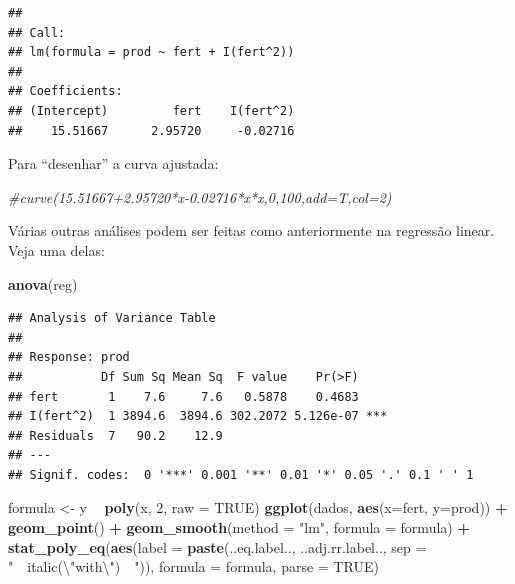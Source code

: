 \documentclass[
]{book}
\newenvironment{Shaded}{\begin{snugshade}}{\end{snugshade}}
\newcommand{\CharTok}[1]{\textcolor[rgb]{0.31,0.60,0.02}{#1}}
\newcommand{\CommentTok}[1]{\textcolor[rgb]{0.56,0.35,0.01}{\textit{#1}}}
\newcommand{\DataTypeTok}[1]{\textcolor[rgb]{0.13,0.29,0.53}{#1}}
\newcommand{\DecValTok}[1]{\textcolor[rgb]{0.00,0.00,0.81}{#1}}
\newcommand{\KeywordTok}[1]{\textcolor[rgb]{0.13,0.29,0.53}{\textbf{#1}}}
\newcommand{\NormalTok}[1]{#1}
\newcommand{\OperatorTok}[1]{\textcolor[rgb]{0.81,0.36,0.00}{\textbf{#1}}}
\newcommand{\OtherTok}[1]{\textcolor[rgb]{0.56,0.35,0.01}{#1}}
\newcommand{\StringTok}[1]{\textcolor[rgb]{0.31,0.60,0.02}{#1}}
\begin{document}
\begin{verbatim}
## 
## Call:
## lm(formula = prod ~ fert + I(fert^2))
## 
## Coefficients:
## (Intercept)         fert    I(fert^2)  
##    15.51667      2.95720     -0.02716
\end{verbatim}

Para ``desenhar'' a curva ajustada:

\begin{Shaded}
\begin{Highlighting}[]
\CommentTok{#curve(15.51667+2.95720*x-0.02716*x*x,0,100,add=T,col=2)}
\end{Highlighting}
\end{Shaded}

Várias outras análises podem ser feitas como anteriormente na regressão linear. Veja uma delas:

\begin{Shaded}
\begin{Highlighting}[]
 \KeywordTok{anova}\NormalTok{(reg)}
\end{Highlighting}
\end{Shaded}

\begin{verbatim}
## Analysis of Variance Table
## 
## Response: prod
##           Df Sum Sq Mean Sq  F value    Pr(>F)    
## fert       1    7.6     7.6   0.5878    0.4683    
## I(fert^2)  1 3894.6  3894.6 302.2072 5.126e-07 ***
## Residuals  7   90.2    12.9                       
## ---
## Signif. codes:  0 '***' 0.001 '**' 0.01 '*' 0.05 '.' 0.1 ' ' 1
\end{verbatim}

\begin{Shaded}
\begin{Highlighting}[]
\NormalTok{ formula <-}\StringTok{ }\NormalTok{y }\OperatorTok{~}\StringTok{ }\KeywordTok{poly}\NormalTok{(x, }\DecValTok{2}\NormalTok{, }\DataTypeTok{raw =} \OtherTok{TRUE}\NormalTok{)}
 \KeywordTok{ggplot}\NormalTok{(dados, }\KeywordTok{aes}\NormalTok{(}\DataTypeTok{x=}\NormalTok{fert, }\DataTypeTok{y=}\NormalTok{prod)) }\OperatorTok{+}
\StringTok{   }\KeywordTok{geom_point}\NormalTok{() }\OperatorTok{+}
\StringTok{   }\KeywordTok{geom_smooth}\NormalTok{(}\DataTypeTok{method =} \StringTok{"lm"}\NormalTok{, }\DataTypeTok{formula =}\NormalTok{ formula) }\OperatorTok{+}
\StringTok{   }\KeywordTok{stat_poly_eq}\NormalTok{(}\KeywordTok{aes}\NormalTok{(}\DataTypeTok{label =}  \KeywordTok{paste}\NormalTok{(..eq.label.., ..adj.rr.label.., }
     \DataTypeTok{sep =} \StringTok{"~~italic(}\CharTok{\textbackslash{}"}\StringTok{with}\CharTok{\textbackslash{}"}\StringTok{)~~"}\NormalTok{)),}
     \DataTypeTok{formula =}\NormalTok{ formula, }\DataTypeTok{parse =} \OtherTok{TRUE}\NormalTok{)}
\end{Highlighting}
\end{Shaded}
\end{document}
